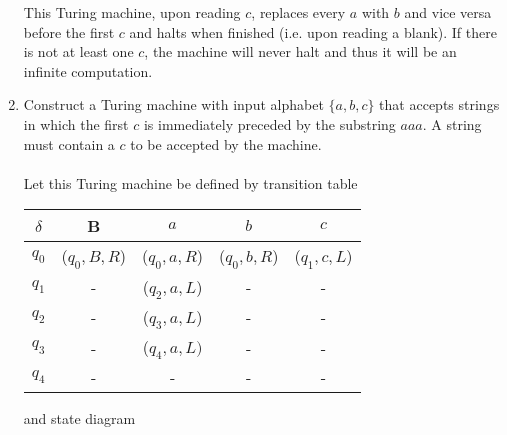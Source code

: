 \documentclass[12pt]{article}
\begin{document}
\begin{enumerate}
\begin{enumerate}
\begin{center}
        \end{center}
    \end{enumerate}
    This Turing machine, upon reading $c$, replaces every $a$ with $b$ and vice versa before the first $c$ and halts when finished (i.e. upon reading a blank). If there is not at least one $c$, the machine will never halt and thus it will be an infinite computation.
\newpage
  \item Construct a Turing machine with input alphabet $\{a,b,c\}$ that accepts strings in which the first $c$ is immediately preceded by the substring $aaa$. A string must contain a $c$ to be accepted by the machine. \\ \\
    Let this Turing machine be defined by transition table
    \begin{center}
      \begin{tabular}{c|cccc}
        $\delta$ & B & $a$ & $b$ & $c$ \\
        \hline
        $q_0$ & ($q_0,B,R$) & ($q_0,a,R$) & ($q_0,b,R$) & ($q_1,c,L$) \\ 
        $q_1$ & - & ($q_2,a,L$) & - & - \\
        $q_2$ & - & ($q_3,a,L$) & - & - \\
        $q_3$ & - & ($q_4,a,L)$ & - & - \\
        $q_4$ & - & - & - & - \\
      \end{tabular}
    \end{center}
    and state diagram
   
    \begin{center}
\end{center}
\end{enumerate}
\end{document}
